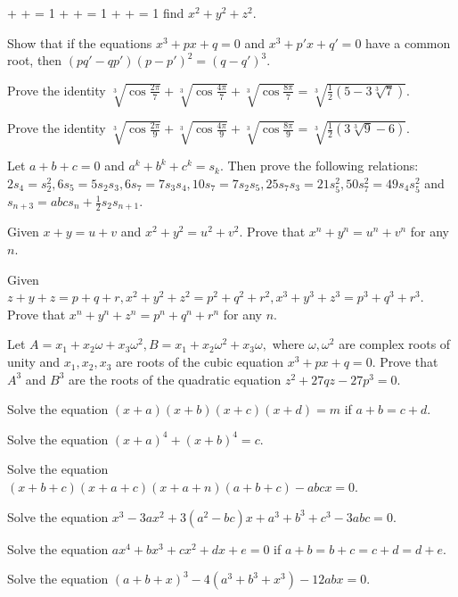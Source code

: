   \startformula {} +  +  = 1\stopformula
  \startformula {} +  +  = 1\stopformula
  \startformula {} +  +  = 1\stopformula
  find $x^2 + y^2 + z^2$.
\item Show that if the equations $x^3 + px + q = 0$ and $x^3 + p'x + q' = 0$ have a common root, then $(pq' - qp')(p - p')^2 = (q -
  q')^3$.
\item Prove the identity $\sqrt[3]{\cos\frac{2\pi}{7}} + \sqrt[3]{\cos\frac{4\pi}{7}} + \sqrt[3]{\cos\frac{8\pi}{7}} =
  \sqrt[3]{\frac{1}{2}(5 - 3\sqrt[3]{7})}$.
\item Prove the identity $\sqrt[3]{\cos\frac{2\pi}{9}} + \sqrt[3]{\cos\frac{4\pi}{9}} + \sqrt[3]{\cos\frac{8\pi}{9}} =
  \sqrt[3]{\frac{1}{2}(3\sqrt[3]{9} - 6)}$.
\item Let $a + b + c = 0$ and $a^k + b^k + c^k = s_k$. Then prove the following relations: $2s_4 = s_2^2, 6s_5 = 5s_2s_3, 6s_7 =
  7s_3s_4, 10s_7 = 7s_2s_5, 25s_7s_3 = 21s_5^2, 50s_7^2 = 49s_4s_5^2$ and $s_{n + 3} = abcs_n + \frac{1}{2}s_2s_{n + 1}$.
\item Given $x + y = u + v$ and $x^2 + y^2 = u^2 + v^2$. Prove that $x^n + y^n = u^n + v^n$ for any $n$.
\item Given $z + y + z = p + q + r, x^2 + y^2 + z^2 = p^2 + q^2 + r^2, x^3 + y^3 + z^3 = p^3 + q^3 + r^3$. Prove that $x^n + y^n +
  z^n = p^n + q^n + r^n$ for any $n$.
\item Let $A = x_1 + x_2\omega + x_3\omega^2, B = x_1 + x_2\omega^2 + x_3\omega,$ where $\omega, \omega^2$ are complex roots of
  unity and $x_1, x_2, x_3$ are roots of the cubic equation $x^3 + px + q = 0$. Prove that $A^3$ and $B^3$ are the roots of the
  quadratic equation $z^2 + 27qz - 27p^3 = 0$.
\item Solve the equation $(x + a)(x + b)(x + c)(x + d) = m$ if $a + b = c + d$.
\item Solve the equation $(x + a)^4 + (x + b)^4 = c$.
\item Solve the equation $(x + b + c)(x + a + c)(x + a + n)(a + b + c) - abcx = 0$.
\item Solve the equation $x^3 - 3ax^2 + 3(a^2 - bc)x + a^3 + b^3 + c^3 - 3abc = 0$.
\item Solve the equation $ax^4 + bx^3 + cx^2 + dx + e = 0$ if $a + b = b + c = c + d = d + e$.
\item Solve the equation $(a + b + x)^3 - 4(a^3 + b^3 + x^3) - 12abx = 0$.
